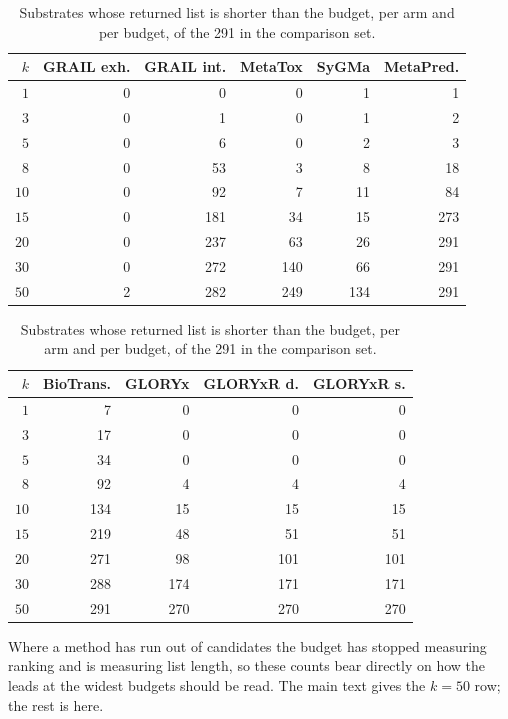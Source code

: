 \begin{table}[h]
\centering\small
\begin{threeparttable}
\caption{Substrates whose returned list is shorter than the budget, per arm and per budget, of the 291 in the comparison set.}
\label{tab:si-short}
\begin{tabular}{rrrrrr}
\toprule
$k$ & GRAIL exh. & GRAIL int. & MetaTox & SyGMa & MetaPred. \\
\midrule
$1$ & 0 & 0 & 0 & 1 & 1 \\
$3$ & 0 & 1 & 0 & 1 & 2 \\
$5$ & 0 & 6 & 0 & 2 & 3 \\
$8$ & 0 & 53 & 3 & 8 & 18 \\
$10$ & 0 & 92 & 7 & 11 & 84 \\
$15$ & 0 & 181 & 34 & 15 & 273 \\
$20$ & 0 & 237 & 63 & 26 & 291 \\
$30$ & 0 & 272 & 140 & 66 & 291 \\
$50$ & 2 & 282 & 249 & 134 & 291 \\
\bottomrule
\end{tabular}

\vspace{5pt}

\begin{tabular}{rrrrr}
\toprule
$k$ & BioTrans. & GLORYx & GLORYxR d. & GLORYxR s. \\
\midrule
$1$ & 7 & 0 & 0 & 0 \\
$3$ & 17 & 0 & 0 & 0 \\
$5$ & 34 & 0 & 0 & 0 \\
$8$ & 92 & 4 & 4 & 4 \\
$10$ & 134 & 15 & 15 & 15 \\
$15$ & 219 & 48 & 51 & 51 \\
$20$ & 271 & 98 & 101 & 101 \\
$30$ & 288 & 174 & 171 & 171 \\
$50$ & 291 & 270 & 270 & 270 \\
\bottomrule
\end{tabular}
\begin{tablenotes}[flushleft]\footnotesize
\item Where a method has run out of candidates the budget has stopped measuring ranking and is measuring list length, so these counts bear directly on how the leads at the widest budgets should be read. The main text gives the $k=50$ row; the rest is here.
\end{tablenotes}
\end{threeparttable}
\end{table}
